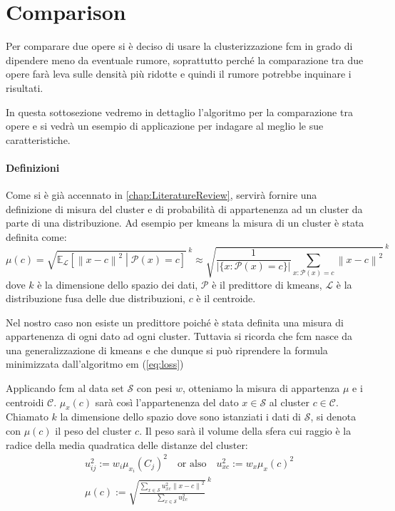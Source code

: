 \section{Comparison}
Per comparare due opere si è deciso di usare la clusterizzazione \gls{fcm} in grado di dipendere meno da eventuale rumore, soprattutto perché la comparazione tra due opere farà leva sulle densità più ridotte e quindi il rumore potrebbe inquinare i risultati.

\noindent In questa sottosezione vedremo in dettaglio l'algoritmo per la comparazione tra opere e si vedrà un esempio di applicazione per indagare al meglio le sue caratteristiche.

\paragraph{Definizioni}
Come si è già accennato in \cref{chap:LiteratureReview}, servirà fornire una definizione di misura del cluster e di probabilità di appartenenza ad un cluster da parte di una distribuzione. Ad esempio per \gls{kmeans} la misura di un cluster è stata definita come:
\begin{equation*}
	\mu(c) = {\sqrt{\mathbb{E}_\mathcal{L}\left[\left\|x-c\right\|^2\middle|\mathcal{P}(x)=c\right]}\,}^{k} \approx {\sqrt{\frac{1}{\left|\{x:\mathcal{P}(x)=c\}\right|}\sum_{x:\mathcal{P}(x)=c}\left\|x-c\right\|^2}\,}^{k}
\end{equation*}
dove $k$ è la dimensione dello spazio dei dati, $\mathcal{P}$ è il predittore di \gls{kmeans}, $\mathcal{L}$ è la distribuzione fusa delle due distribuzioni, $c$ è il centroide.

\noindent Nel nostro caso non esiste un predittore poiché è stata definita una misura di appartenenza di ogni dato ad ogni cluster. Tuttavia si ricorda che \gls{fcm} nasce da una generalizzazione di \gls{kmeans} e che dunque si può riprendere la formula minimizzata dall'algoritmo \gls{em} (\cref{eq:loss})
\begin{definition}
\label{def:cluster_measure}
	Applicando \gls{fcm} al data set $\mathcal{S}$ con pesi $w$, otteniamo la misura di appartenza $\mu$ e i centroidi $\mathcal{C}$. $\mu_x(c)$ sarà così l'appartenenza del dato $x\in\mathcal{S}$ al cluster $c\in\mathcal{C}$. Chiamato $k$ la dimensione dello spazio dove sono istanziati i dati di $\mathcal{S}$, si denota con $\mu(c)$ il peso del cluster $c$. Il peso sarà il volume della sfera cui raggio è la radice della media quadratica delle distanze del cluster:
	\begin{align}
		&u_{ij}^2 := w_i\mu_{x_i}(C_j)^2 \quad \text{or also} \quad u_{xc}^2 := w_x\mu_{x}(c)^2\\
		&\mu(c) := {\sqrt{\frac{\sum_{x\in\mathcal{S}} u_{xc}^2 \left\|x-c\right\|^2}{\sum_{x\in\mathcal{S}}u_{xc}^2}}\,}^k
		\label{eq:fcm_cluster_measure}
	\end{align}
\end{definition}

